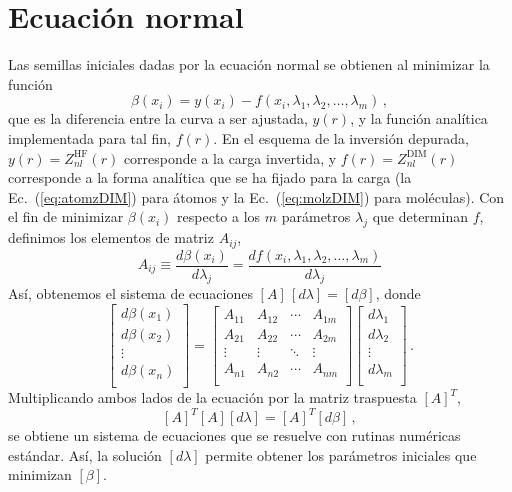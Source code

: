 \appendix

\chapter{Ecuación normal}
\label{app:ecnormal}

Las semillas iniciales dadas por la ecuación normal se obtienen al 
minimizar la función
\begin{equation}
 \beta(x_i) = y(x_i) - f(x_i,\lambda_1,\lambda_2,\dots,\lambda_m)\,,
\end{equation}
que es la diferencia entre la curva a ser ajustada, $y(r)$, y la función
analítica implementada para tal fin, $f(r)$. En el esquema de la 
inversión depurada, $y(r) = Z_{nl}^{\mathrm{HF}}(r)$ corresponde a la 
carga invertida, y $f(r) = Z_{nl}^{\mathrm{DIM}}(r)$ corresponde a la 
forma analítica que se ha fijado para la carga (la 
Ec.~(\ref{eq:atomzDIM}) para átomos y la Ec.~(\ref{eq:molzDIM}) para 
moléculas). Con el fin de minimizar $\beta(x_i)$ respecto a los $m$ 
parámetros $\lambda_j$ que determinan $f$, definimos los elementos de 
matriz $A_{ij}$,
\begin{equation}
  A_{ij} \equiv \frac{d\beta(x_i)}{d\lambda_j} =
 \frac{df(x_i,\lambda_1,\lambda_2,\dots, \lambda_m)}{d\lambda_j}
\end{equation}
Así, obtenemos el sistema de ecuaciones $[A] \,[d\lambda] = [d\beta]$, 
donde
\begin{equation}
 \left[
 \begin{array}{c}
  d\beta(x_1) \\
  d\beta(x_2) \\
  \vdots \\
  d\beta(x_n) \\
 \end{array}
 \right] =
 \left[
 \begin{array}{cccc}
  A_{11} & A_{12} & \cdots & A_{1m} \\
  A_{21} & A_{22} & \cdots & A_{2m} \\
  \vdots & \vdots & \ddots & \vdots \\
  A_{n1} & A_{n2} & \cdots & A_{nm} \\
 \end{array}
 \right]
 \left[
 \begin{array}{c}
 d\lambda_1 \\
 d\lambda_2 \\
 \vdots \\
 d\lambda_m \\
 \end{array}
 \right] \,.
\end{equation}
Multiplicando ambos lados de la ecuación por la matriz traspuesta 
$[A]^{T}$,
\begin{equation}
  \left[ A \right]^T \left[ A \right]\left[ d\lambda \right] =
  \left[ A \right]^T \left[ d\beta \right]\,,
\end{equation}
se obtiene un sistema de ecuaciones que se resuelve con rutinas 
numéricas estándar. Así, la solución $[d\lambda]$ permite obtener los 
parámetros iniciales que minimizan $[\beta]$.

